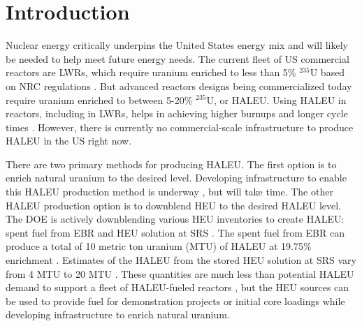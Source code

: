 \section{Introduction}
Nuclear energy critically underpins the United States 
energy mix and 
will likely be needed to help meet future energy needs. 
The current 
fleet of US commercial reactors are \glspl*{LWR}, 
which require uranium enriched to less than 5\% $^{235}$U
based on \gls*{NRC} regulations \cite{noauthor_10_2006}.
But advanced reactors designs being commercialized 
today  require 
uranium enriched to between 5-20\% $^{235}$U, or \gls*{HALEU}. 
Using \gls*{HALEU} in reactors, including in \glspl*{LWR}, 
helps in achieving higher burnups and longer cycle 
times \cite{carlson_implications_2022}.
However, there is currently no commercial-scale infrastructure to 
produce \gls*{HALEU} in the US right now. 

There are two primary methods for producing \gls*{HALEU}. The first 
option is to enrich natural uranium to the desired level. Developing 
infrastructure to enable this \gls*{HALEU} production method 
is underway 
\cite{nuclear_energy_institute_establishing_2022,us_nuclear_regulatory_commission_centrus_2021},
but will take time. 
The other \gls*{HALEU} production option is to downblend \gls*{HEU} to 
the desired \gls*{HALEU}
level. The \gls*{DOE} is actively downblending various \gls*{HEU} inventories
to create \gls*{HALEU}: spent fuel from \gls*{EBR} and \gls*{HEU} solution 
at \gls*{SRS} \cite{nuclear_energy_institute_establishing_2022}. The 
spent fuel from \gls*{EBR} can produce a total of 10 metric ton uranium (MTU) 
of \gls*{HALEU} at 19.75\% enrichment 
\cite{nuclear_energy_institute_establishing_2022}. 
Estimates of the \gls*{HALEU} from the stored \gls*{HEU} solution 
at \gls*{SRS} vary from 4 MTU \cite{nuclear_energy_institute_establishing_2022} 
to 20 MTU \cite{regalbuto_addressing_2020}.
These quantities are much less than potential \gls*{HALEU} demand 
to support a fleet of \gls*{HALEU}-fueled reactors 
\cite{dixon_estimated_2022,bachmann_enrichment_2021}, but the \gls*{HEU} 
sources can be used to provide fuel for demonstration 
projects or initial core loadings while developing infrastructure 
to enrich natural uranium. 

